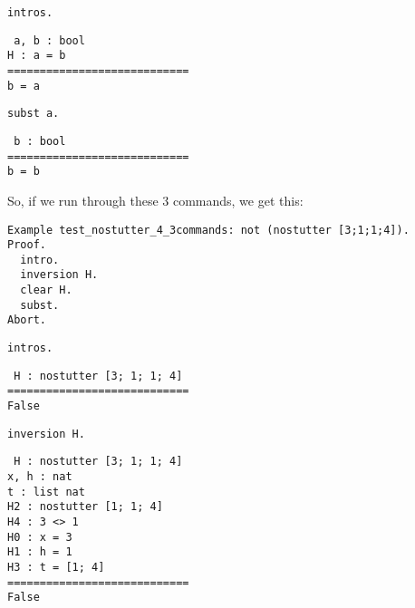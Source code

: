 \documentclass[12pt]{article}
\newcommand{\codeBlock}[1]{\colorbox{cverbbg}{\parbox{0.85\textwidth}{#1}}}
\begin{document}
\begin{minipage}[t]{.45\textwidth}
\begin{verbatim}
intros.
\end{verbatim}

\codeBlock{{\tt
a, b : bool\\
H : a = b\\
============================\\
b = a
}}
\end{minipage}
\hfill
\begin{minipage}[t]{.45\textwidth}
\begin{verbatim}
subst a.
\end{verbatim}

\codeBlock{{\tt
b : bool\\
============================\\
b = b
}}
\end{minipage}

So, if we run through these 3 commands, we get this:

\begin{verbatim}
Example test_nostutter_4_3commands: not (nostutter [3;1;1;4]).
Proof.
  intro.
  inversion H.
  clear H.
  subst.
Abort.
\end{verbatim}

\begin{minipage}[t]{.45\textwidth}
\begin{verbatim}
intros.
\end{verbatim}

\codeBlock{{\tt
H : nostutter [3; 1; 1; 4]\\
============================\\
False
}}
\end{minipage}
\hfill
\begin{minipage}[t]{.45\textwidth}
\begin{verbatim}
inversion H.
\end{verbatim}

\codeBlock{{\tt
H : nostutter [3; 1; 1; 4]\\
x, h : nat\\
t : list nat\\
H2 : nostutter [1; 1; 4]\\
H4 : 3 <> 1\\
H0 : x = 3\\
H1 : h = 1\\
H3 : t = [1; 4]\\
============================\\
False
}}
\end{minipage}
\end{document}
